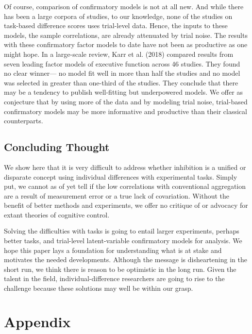 \documentclass[
  english,
  ,man]{apa6}
\begin{document}
Of course, comparison of confirmatory models is not at all new. And while there has been a large corpora of studies, to our knowledge, none of the studies on task-based difference scores uses trial-level data. Hence, the inputs to these models, the sample correlations, are already attenuated by trial noise. The results with these confirmatory factor models to date have not been as productive as one might hope. In a large-scale review, Karr et al. (2018) compared results from seven leading factor models of executive function across 46 studies. They found no clear winner--- no model fit well in more than half the studies and no model was selected in greater than one-third of the studies. They conclude that there may be a tendency to publish well-fitting but underpowered models. We offer as conjecture that by using more of the data and by modeling trial noise, trial-based confirmatory models may be more informative and productive than their classical counterparts.

\hypertarget{concluding-thought}{%
\subsection{Concluding Thought}\label{concluding-thought}}

We show here that it is very difficult to address whether inhibition is a unified or disparate concept using individual differences with experimental tasks. Simply put, we cannot as of yet tell if the low correlations with conventional aggregation are a result of measurement error or a true lack of covariation. Without the benefit of better methods and experiments, we offer no critique of or advocacy for extant theories of cognitive control.

Solving the difficulties with tasks is going to entail larger experiments, perhaps better tasks, and trial-level latent-variable confirmatory models for analysis. We hope this paper lays a foundation for understanding what is at stake and motivates the needed developments. Although the message is disheartening in the short run, we think there is reason to be optimistic in the long run. Given the talent in the field, individual-difference researchers are going to rise to the challenge because these solutions may well be within our grasp.

\newpage

\hypertarget{appendix}{%
\section{Appendix}\label{appendix}}
\end{document}
